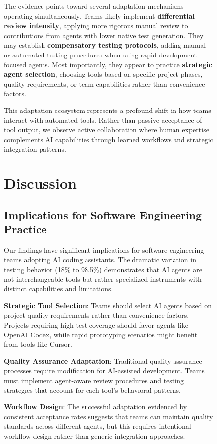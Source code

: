 \documentclass[conference]{IEEEtran}
\begin{document}
\begin{figure}[H]
The evidence points toward several adaptation mechanisms operating simultaneously. Teams likely implement \textbf{differential review intensity}, applying more rigorous manual review to contributions from agents with lower native test generation. They may establish \textbf{compensatory testing protocols}, adding manual or automated testing procedures when using rapid-development-focused agents. Most importantly, they appear to practice \textbf{strategic agent selection}, choosing tools based on specific project phases, quality requirements, or team capabilities rather than convenience factors.

This adaptation ecosystem represents a profound shift in how teams interact with automated tools. Rather than passive acceptance of tool output, we observe active collaboration where human expertise complements AI capabilities through learned workflows and strategic integration patterns.

\section{Discussion}

\subsection{Implications for Software Engineering Practice}

Our findings have significant implications for software engineering teams adopting AI coding assistants. The dramatic variation in testing behavior (18\% to 98.5\%) demonstrates that AI agents are not interchangeable tools but rather specialized instruments with distinct capabilities and limitations.

\textbf{Strategic Tool Selection}: Teams should select AI agents based on project quality requirements rather than convenience factors. Projects requiring high test coverage should favor agents like OpenAI Codex, while rapid prototyping scenarios might benefit from tools like Cursor.

\textbf{Quality Assurance Adaptation}: Traditional quality assurance processes require modification for AI-assisted development. Teams must implement agent-aware review procedures and testing strategies that account for each tool's behavioral patterns.

\textbf{Workflow Design}: The successful adaptation evidenced by consistent acceptance rates suggests that teams can maintain quality standards across different agents, but this requires intentional workflow design rather than generic integration approaches.


\end{figure}
\end{document}
